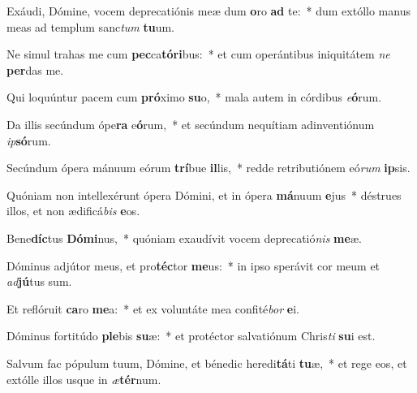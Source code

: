 \item Exáudi, Dómine, vocem deprecatiónis meæ dum \textbf{o}ro \textbf{ad} te:~* dum extóllo manus meas ad templum sanc\textit{tum} \textbf{tu}um.
\item Ne simul trahas me cum \textbf{pec}ca\textbf{tó}\textbf{ri}bus:~* et cum operántibus iniquitátem \textit{ne} \textbf{per}das me.
\item Qui loquúntur pacem cum \textbf{pró}ximo \textbf{su}o,~* mala autem in córdibus \textit{e}\textbf{ó}rum.
\item Da illis secúndum ópe\textbf{ra} e\textbf{ó}rum,~* et secúndum nequítiam adinventiónum \textit{ip}\textbf{só}rum.
\item Secúndum ópera mánuum eórum \textbf{trí}bue \textbf{il}lis,~* redde retributiónem eó\textit{rum} \textbf{ip}sis.
\item Quóniam non intellexérunt ópera Dómini, et in ópera \textbf{má}nuum \textbf{e}jus~* déstrues illos, et non ædificá\textit{bis} \textbf{e}os.
\item Bene\textbf{díc}tus \textbf{Dó}\textbf{mi}nus,~* quóniam exaudívit vocem deprecatió\textit{nis} \textbf{me}æ.
\item Dóminus adjútor meus, et pro\textbf{téc}tor \textbf{me}us:~* in ipso sperávit cor meum et \textit{ad}\textbf{jú}tus sum.
\item Et reflóruit \textbf{ca}ro \textbf{me}a:~* et ex voluntáte mea confité\textit{bor} \textbf{e}i.
\item Dóminus fortitúdo \textbf{ple}bis \textbf{su}æ:~* et protéctor salvatiónum Chris\textit{ti} \textbf{su}i est.
\item Salvum fac pópulum tuum, Dómine, et bénedic heredi\textbf{tá}ti \textbf{tu}æ,~* et rege eos, et extólle illos usque in \textit{æ}\textbf{tér}num.
